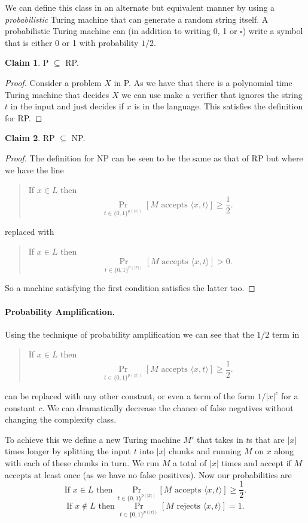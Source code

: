 \documentclass[11pt,a4paper]{article}
\theoremstyle{definition}
\newtheorem{claim}{Claim}
\begin{document}
We can define this class in an alternate but equivalent manner by using a \emph{probabilistic} Turing machine that can generate a random string itself.
A probabilistic Turing machine can (in addition to writing 0, 1 or $\square$) write a symbol that is either 0 or 1 with probability $1/2$.

\begin{claim}
P $\subseteq$ RP.
\end{claim}
\begin{proof}
Consider a problem $X$ in P.
As we have that there is a polynomial time Turing machine that decides $X$ we can use make a verifier that ignores the string $t$ in the input and just decides if $x$ is in the language.
This satisfies the definition for RP.
\end{proof}

\begin{claim}
RP $\subseteq$ NP.
\end{claim}
\begin{proof}
The definition for NP can be seen to be the same as that of RP but where we have the line
\begin{quote}
If $x\in L$ then \[\Pr_{t\in \{0,1\}^{p(|x|)}}[M \text{ accepts } \langle x, t\rangle] \ge \frac{1}{2}.\]
\end{quote}
replaced with
\begin{quote}
If $x\in L$ then \[\Pr_{t\in \{0,1\}^{p(|x|)}}[M \text{ accepts } \langle x, t\rangle] > 0.\]
\end{quote}
So a machine satisfying the first condition satisfies the latter too.
\end{proof}

\paragraph{Probability Amplification.}
Using the technique of probability amplification we can see that the $1/2$ term in
\begin{quote}
If $x\in L$ then \[\Pr_{t\in \{0,1\}^{p(|x|)}}[M \text{ accepts } \langle x, t\rangle] \ge \frac{1}{2}.\]
\end{quote}
can be replaced with any other constant, or even a term of the form $1/|x|^c$ for a constant $c$.
We can dramatically decrease the chance of false negatives without changing the complexity class.

To achieve this we define a new Turing machine $M'$ that takes in $t$s that are $|x|$ times longer by splitting the input $t$ into $|x|$ chunks and running $M$ on $x$ along with each of these chunks in turn.
We run $M$ a total of $|x|$ times and accept if $M$ accepts at least once (as we have no false positives).
Now our probabilities are
\[\text{If } x\in L \text{ then } \Pr_{t\in \{0,1\}^{p(|x|)}}[M \text{ accepts } \langle x, t\rangle] \ge \frac{1}{2}.\]
\[\text{If } x\not\in L \text{ then } \Pr_{t\in \{0,1\}^{p(|x|)}}[M \text{ rejects } \langle x, t\rangle] = 1.\]
\end{document}
